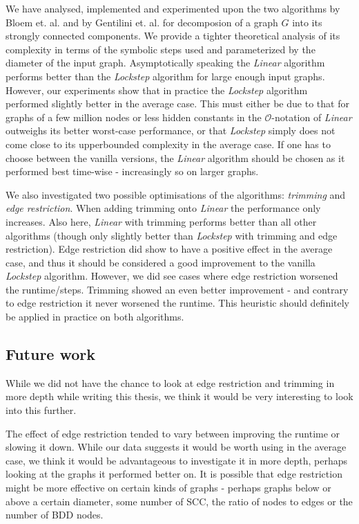 \documentclass[../master/master.tex]{subfiles}
\begin{document}
We have analysed, implemented and experimented upon the two algorithms by Bloem et. al. \cite{linear} and by Gentilini et. al. \cite{lockstep} for decomposion of a graph
$G$ into its strongly connected components. We provide a tighter theoretical analysis of its complexity in terms of the symbolic steps used and parameterized by the diameter of the input graph. Asymptotically speaking the \textit{Linear} algorithm performs better than the \textit{Lockstep} algorithm for large enough input graphs. However, our experiments show that in practice the \textit{Lockstep} algorithm performed slightly better in the average case. This must either be due to that for graphs of a few million nodes or less hidden constants in the $\mathcal{O}$-notation of \textit{Linear} outweighs its better worst-case performance, or that \textit{Lockstep} simply does not come close to its upperbounded complexity in the average case. If one has to choose between the vanilla versions, the \textit{Linear} algorithm should be chosen as it performed best time-wise - increasingly so on larger graphs.

We also investigated two possible optimisations of the algorithms: \textit{trimming} and \textit{edge restriction}. When adding trimming onto \textit{Linear} the performance only increases. Also here, \textit{Linear} with trimming performs better than all other algorithms (though only slightly better than \textit{Lockstep} with trimming and edge restriction). Edge restriction did show to have a positive effect in the average case, and thus it should be considered a good improvement to the vanilla \textit{Lockstep} algorithm. However, we did see cases where edge restriction worsened the runtime/steps. Trimming showed an even better improvement - and contrary to edge restriction it never worsened the runtime. This heuristic should definitely be applied in practice on both algorithms.

\subsection{Future work}
While we did not have the chance to look at edge restriction and trimming in more depth while writing this thesis, we think it would be very interesting to look into this further.

The effect of edge restriction tended to vary between improving the runtime or slowing it down. While our data suggests it would be worth using in the average case, we think it would be advantageous to investigate it in more depth, perhaps looking at the graphs it performed better on. It is possible that edge restriction might be more effective on certain kinds of graphs - perhaps graphs below or above a certain diameter, some number of SCC, the ratio of nodes to edges or the number of BDD nodes.
\end{document}
